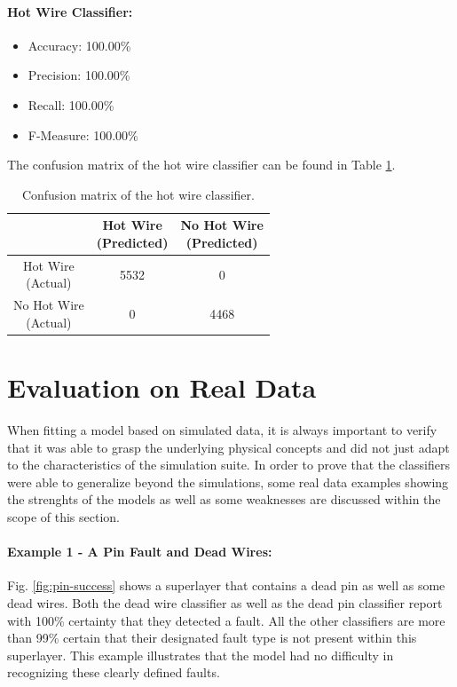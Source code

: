 \paragraph{Hot Wire Classifier:}
\begin{itemize}
  \item Accuracy: 100.00\%
  \item Precision: 100.00\%
  \item Recall: 100.00\%
  \item F-Measure: 100.00\%
\end{itemize}
The confusion matrix of the hot wire classifier can be found in Table
\ref{tbl:confusion-hotwire}.
\begin{table}[h]
  \centering
  \renewcommand\theadfont{\bfseries}
  \begin{tabular}{|c|c|c|}
    \hline
    & \thead{Hot Wire\\(Predicted)} & \thead{No Hot Wire\\(Predicted)} \\
    \hline
    \thead{Hot Wire\\(Actual)} & 5532 & 0\\
    \hline
    \thead{No Hot Wire\\(Actual)} & 0 & 4468\\
    \hline
  \end{tabular}
  \caption{Confusion matrix of the hot wire classifier.}
  \label{tbl:confusion-hotwire}
\end{table}

\section{Evaluation on Real Data}

When fitting a model based on simulated data, it is always important
to verify that it was able to grasp the underlying physical concepts
and did not just adapt to the characteristics of the simulation suite.
In order to prove that the classifiers were able to generalize beyond
the simulations, some real data examples showing the strenghts of
the models as well as some weaknesses are discussed within the scope of
this section.

\paragraph{Example 1 - A Pin Fault and Dead Wires:}

Fig. \ref{fig:pin-success} shows a superlayer that contains a dead pin
as well as some dead wires.  Both the dead wire classifier as well as
the dead pin classifier report with 100\% certainty that they detected
a fault. All the other classifiers are more than 99\% certain that
their designated fault type is not present within this
superlayer. This example illustrates that the model had no difficulty
in recognizing these clearly defined faults.

